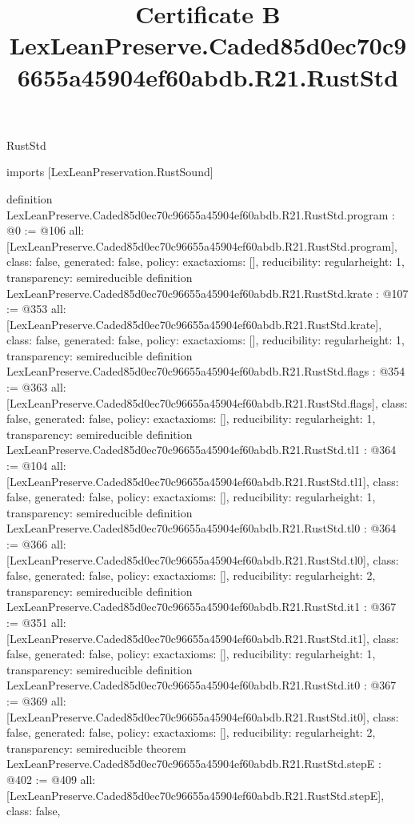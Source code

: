 \begin{lexlean}{RustStd}
\title{Certificate B LexLeanPreserve.Caded85d0ec70c96655a45904ef60abdb.R21.RustStd}
\begin{coremodule}
imports [LexLeanPreservation.RustSound]

definition LexLeanPreserve.Caded85d0ec70c96655a45904ef60abdb.R21.RustStd.program : @0 := @106 {
  all: [LexLeanPreserve.Caded85d0ec70c96655a45904ef60abdb.R21.RustStd.program],
  class: false,
  generated: false,
  policy: exact{axioms: []},
  reducibility: regular{height: 1},
  transparency: semireducible
}
definition LexLeanPreserve.Caded85d0ec70c96655a45904ef60abdb.R21.RustStd.krate : @107 := @353 {
  all: [LexLeanPreserve.Caded85d0ec70c96655a45904ef60abdb.R21.RustStd.krate],
  class: false,
  generated: false,
  policy: exact{axioms: []},
  reducibility: regular{height: 1},
  transparency: semireducible
}
definition LexLeanPreserve.Caded85d0ec70c96655a45904ef60abdb.R21.RustStd.flags : @354 := @363 {
  all: [LexLeanPreserve.Caded85d0ec70c96655a45904ef60abdb.R21.RustStd.flags],
  class: false,
  generated: false,
  policy: exact{axioms: []},
  reducibility: regular{height: 1},
  transparency: semireducible
}
definition LexLeanPreserve.Caded85d0ec70c96655a45904ef60abdb.R21.RustStd.tl1 : @364 := @104 {
  all: [LexLeanPreserve.Caded85d0ec70c96655a45904ef60abdb.R21.RustStd.tl1],
  class: false,
  generated: false,
  policy: exact{axioms: []},
  reducibility: regular{height: 1},
  transparency: semireducible
}
definition LexLeanPreserve.Caded85d0ec70c96655a45904ef60abdb.R21.RustStd.tl0 : @364 := @366 {
  all: [LexLeanPreserve.Caded85d0ec70c96655a45904ef60abdb.R21.RustStd.tl0],
  class: false,
  generated: false,
  policy: exact{axioms: []},
  reducibility: regular{height: 2},
  transparency: semireducible
}
definition LexLeanPreserve.Caded85d0ec70c96655a45904ef60abdb.R21.RustStd.it1 : @367 := @351 {
  all: [LexLeanPreserve.Caded85d0ec70c96655a45904ef60abdb.R21.RustStd.it1],
  class: false,
  generated: false,
  policy: exact{axioms: []},
  reducibility: regular{height: 1},
  transparency: semireducible
}
definition LexLeanPreserve.Caded85d0ec70c96655a45904ef60abdb.R21.RustStd.it0 : @367 := @369 {
  all: [LexLeanPreserve.Caded85d0ec70c96655a45904ef60abdb.R21.RustStd.it0],
  class: false,
  generated: false,
  policy: exact{axioms: []},
  reducibility: regular{height: 2},
  transparency: semireducible
}
theorem LexLeanPreserve.Caded85d0ec70c96655a45904ef60abdb.R21.RustStd.stepE : @402 := @409 {
  all: [LexLeanPreserve.Caded85d0ec70c96655a45904ef60abdb.R21.RustStd.stepE],
  class: false,
}
\end{coremodule}
\end{lexlean}
